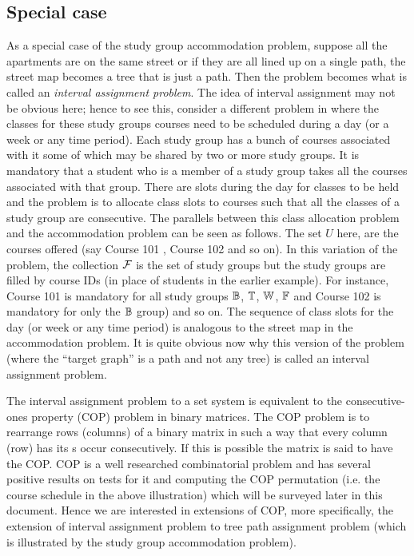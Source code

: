 \subsection{Special case}
\label{sec:courseschedule}
As a special case of the study group accommodation problem, suppose
all the apartments are on the same street or if they are all lined up
on a single path, the street map becomes a tree that is just a
path. Then the problem becomes what is called an {\em interval
  assignment problem}. The idea of interval assignment may not be
obvious here; hence to see this, consider a different problem in
{\WSI} where the classes for these study groups courses need to be
scheduled during a day (or a week or any time period). Each study
group has a bunch of courses associated with it some of which may be
shared by two or more study groups. It is mandatory that a student who
is a member of a study group takes all the courses associated with
that group. There are slots during the day for classes to be held and
the problem is to allocate class slots to courses such that all the
classes of a study group are consecutive. %
The parallels between this class allocation problem and the
accommodation problem can be seen as follows. The set $U$ here, are
the courses offered (say Course 101 {\coneohone}, Course 102
{\coneohtwo} and so on). In this variation of the problem, the
collection ${\cal F}$ is the set of study groups but the study groups are
filled by course IDs (in place of students in the earlier
example). For instance, Course 101 is mandatory for all study groups
$\mathbb{B}$, $\mathbb{T}$, $\mathbb{W}$, $\mathbb{F}$ and Course 102 is mandatory for
only the $\mathbb{B}$ group) and so on. The sequence of class slots for the
day (or week or any time period) is analogous to the street map in the
accommodation problem. It is quite obvious now why this version of the
problem (where the ``target graph'' is a path and not any
tree) is called an interval assignment
problem.

The interval assignment problem to a set system is equivalent to the
consecutive-ones property (COP) problem in binary matrices\cite{wlh02,
  nsnrs09}.  The COP problem is to rearrange rows (columns) of a
binary matrix in such a way that every column (row) has its {\un}s
occur consecutively. If this is possible the matrix is said to have
the COP.  COP is a well researched combinatorial problem and has
several positive results on tests for it and computing the COP
permutation (i.e. the course schedule in the above illustration) which
will be surveyed later in this document. Hence we are interested in
extensions of COP, more specifically, the extension of interval
assignment problem to tree path assignment problem (which is
illustrated by the study group accommodation problem).



